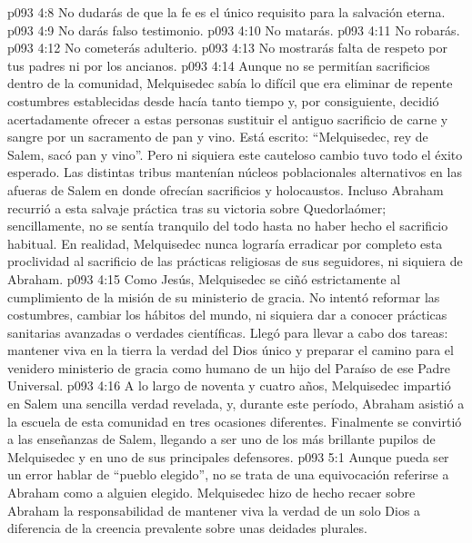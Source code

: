 \vs p093 4:8 No dudarás de que la fe es el único requisito para la salvación eterna.
\vs p093 4:9 No darás falso testimonio.
\vs p093 4:10 No matarás.
\vs p093 4:11 No robarás.
\vs p093 4:12 No cometerás adulterio.
\vs p093 4:13 No mostrarás falta de respeto por tus padres ni por los ancianos.
\vs p093 4:14 \pc Aunque no se permitían sacrificios dentro de la comunidad, Melquisedec sabía lo difícil que era eliminar de repente costumbres establecidas desde hacía tanto tiempo y, por consiguiente, decidió acertadamente ofrecer a estas personas sustituir el antiguo sacrificio de carne y sangre por un sacramento de pan y vino. Está escrito: “Melquisedec, rey de Salem, sacó pan y vino”. Pero ni siquiera este cauteloso cambio tuvo todo el éxito esperado. Las distintas tribus mantenían núcleos poblacionales alternativos en las afueras de Salem en donde ofrecían sacrificios y holocaustos. Incluso Abraham recurrió a esta salvaje práctica tras su victoria sobre Quedorlaómer; sencillamente, no se sentía tranquilo del todo hasta no haber hecho el sacrificio habitual. En realidad, Melquisedec nunca lograría erradicar por completo esta proclividad al sacrificio de las prácticas religiosas de sus seguidores, ni siquiera de Abraham.
\vs p093 4:15 Como Jesús, Melquisedec se ciñó estrictamente al cumplimiento de la misión de su ministerio de gracia. No intentó reformar las costumbres, cambiar los hábitos del mundo, ni siquiera dar a conocer prácticas sanitarias avanzadas o verdades científicas. Llegó para llevar a cabo dos tareas: mantener viva en la tierra la verdad del Dios único y preparar el camino para el venidero ministerio de gracia como humano de un hijo del Paraíso de ese Padre Universal.
\vs p093 4:16 \pc A lo largo de noventa y cuatro años, Melquisedec impartió en Salem una sencilla verdad revelada, y, durante este período, Abraham asistió a la escuela de esta comunidad en tres ocasiones diferentes. Finalmente se convirtió a las enseñanzas de Salem, llegando a ser uno de los más brillante pupilos de Melquisedec y en uno de sus principales defensores.
\vs p093 5:1 Aunque pueda ser un error hablar de “pueblo elegido”, no se trata de una equivocación referirse a Abraham como a alguien elegido. Melquisedec hizo de hecho recaer sobre Abraham la responsabilidad de mantener viva la verdad de un solo Dios a diferencia de la creencia prevalente sobre unas deidades plurales.
